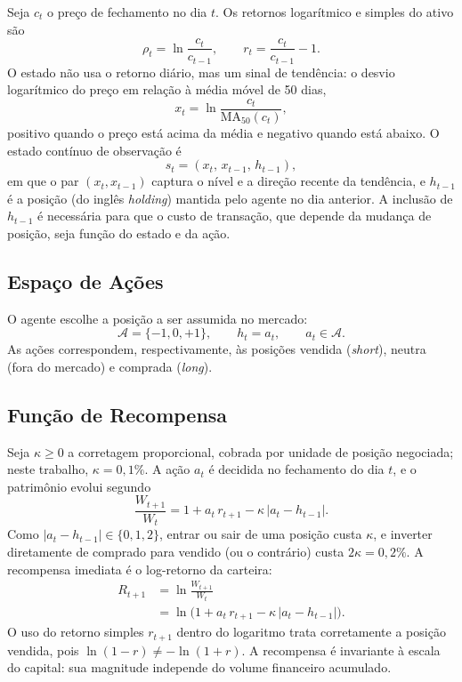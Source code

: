 \documentclass[conference]{IEEEtran}
\begin{document}
Seja $c_t$ o preço de fechamento no dia $t$. Os retornos logarítmico e simples do ativo são~\cite{campbell1997,tsay2010}
\begin{equation}
  \rho_t = \ln\frac{c_t}{c_{t-1}}, \qquad r_t = \frac{c_t}{c_{t-1}} - 1.
\end{equation}
O estado não usa o retorno diário, mas um sinal de tendência: o desvio logarítmico do preço em relação à média móvel de 50 dias,
\begin{equation}
  x_t = \ln\frac{c_t}{\mathrm{MA}_{50}(c_t)},
\end{equation}
positivo quando o preço está acima da média e negativo quando está abaixo. O estado contínuo de observação é
\begin{equation}
  s_t = (x_t,\, x_{t-1},\, h_{t-1}),
\end{equation}
em que o par $(x_t, x_{t-1})$ captura o nível e a direção recente da tendência, e $h_{t-1}$ é a posição (do inglês \textit{holding}) mantida pelo agente no dia anterior. A inclusão de $h_{t-1}$ é necessária para que o custo de transação, que depende da mudança de posição, seja função do estado e da ação.

\subsection{Espaço de Ações}

O agente escolhe a posição a ser assumida no mercado:
\begin{equation}
  \mathcal{A} = \{-1, 0, +1\}, \qquad h_t = a_t, \qquad a_t \in \mathcal{A}.
\end{equation}
As ações correspondem, respectivamente, às posições vendida (\textit{short}), neutra (fora do mercado) e comprada (\textit{long}).

\subsection{Função de Recompensa}
\label{sec:recompensa}

Seja $\kappa \ge 0$ a corretagem proporcional, cobrada por unidade de posição negociada; neste trabalho, $\kappa = 0{,}1\%$. A ação $a_t$ é decidida no fechamento do dia $t$, e o patrimônio evolui segundo~\cite{moody1998,moody2001}
\begin{equation}
  \frac{W_{t+1}}{W_t} = 1 + a_t\, r_{t+1} - \kappa\, |a_t - h_{t-1}|.
\end{equation}
Como $|a_t - h_{t-1}| \in \{0, 1, 2\}$, entrar ou sair de uma posição custa $\kappa$, e inverter diretamente de comprado para vendido (ou o contrário) custa $2\kappa = 0{,}2\%$. A recompensa imediata é o log-retorno da carteira:
\begin{align}
  R_{t+1} &= \ln\frac{W_{t+1}}{W_t} \nonumber \\
          &= \ln\!\big(1 + a_t\, r_{t+1} - \kappa\, |a_t - h_{t-1}|\big).
  \label{eq:recompensa}
\end{align}
O uso do retorno simples $r_{t+1}$ dentro do logaritmo trata corretamente a posição vendida, pois $\ln(1 - r) \neq -\ln(1 + r)$. A recompensa é invariante à escala do capital: sua magnitude independe do volume financeiro acumulado.
\end{document}
